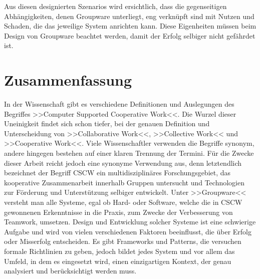 \medskip Aus diesen designierten Szenarios wird ersichtlich, dass die gegenseitigen Abhängigkeiten, denen Groupware unterliegt, eng verknüpft sind mit Nutzen und Schaden, die das jeweilige System anrichten kann. Diese Eigenheiten müssen beim Design von Groupware beachtet werden, damit der Erfolg selbiger nicht gefährdet ist. \citep{Markus:1990}

\section*{Zusammenfassung}
In der Wissenschaft gibt es verschiedene Definitionen und Auslegungen des Begriffes >>Computer Supported Cooperative Work<<. Die Wurzel dieser Uneinigkeit findet sich schon tiefer, bei der genauen Definition und Unterscheidung von >>Collaborative Work<<, >>Collective Work<< und >>Cooperative Work<<. Viele Wissenschaftler verwenden die Begriffe synonym, andere hingegen bestehen auf einer klaren Trennung der Termini. Für die Zwecke dieser Arbeit reicht jedoch eine synonyme Verwendung aus, denn letztendlich bezeichnet der Begriff \ac{CSCW} ein multidisziplinäres Forschungsgebiet, das kooperative Zusammenarbeit innerhalb Gruppen untersucht und Technologien zur Förderung und Unterstützung selbiger entwickelt. Unter >>Groupware<< versteht man alle Systeme, egal ob Hard- oder Software, welche die in \ac{CSCW} gewonnenen Erkenntnisse in die Praxis, zum Zwecke der Verbesserung von Teamwork, umsetzen. Design und Entwicklung solcher Systeme ist eine schwierige Aufgabe und wird von vielen verschiedenen Faktoren beeinflusst, die über Erfolg oder Misserfolg entscheiden. Es gibt Frameworks und Patterns, die versuchen formale Richtlinien zu geben, jedoch bildet jedes System und vor allem das Umfeld, in dem es eingesetzt wird, einen einzigartigen Kontext, der genau analysiert und berücksichtigt werden muss.

